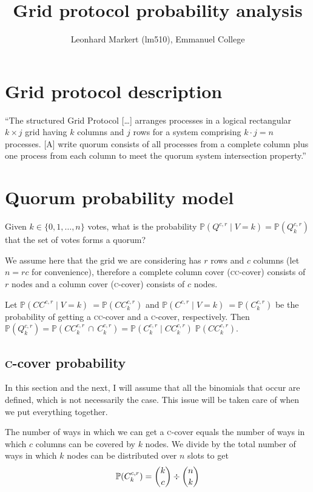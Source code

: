 \documentclass[10pt]{scrartcl}
\title{Grid protocol probability analysis}
\author{Leonhard Markert (lm510), Emmanuel College}
\begin{document}
\maketitle

\section{Grid protocol description%
  \label{grid-protocol-description}%
}

``The structured Grid Protocol [\dots] arranges processes in a logical rectangular \(k \times j\) grid having \(k\) columns and \(j\) rows for a system comprising \(k \cdot j = n\) processes. [A] write quorum consists of all processes from a complete column plus one process from each column to meet the quorum system intersection property.'' \cite{voting}

\section{Quorum probability model%
  \label{quorum-probability-model}%
}

Given \(k \in \{0, 1, \dots, n\}\) votes, what is the probability \(\mathbb{P}(Q^{c,r}\;|\;V=k) = \mathbb{P}(Q^{c,r}_k)\) that the set of votes forms a quorum?

We assume here that the grid we are considering has \(r\) rows and \(c\) columns (let \(n = r c\) for convenience), therefore a complete column cover (\textsc{cc}-cover) consists of \(r\) nodes and a column cover (\textsc{c}-cover) consists of \(c\) nodes.

Let \(\mathbb{P}(CC^{c,r}\;|\;V=k)\ = \mathbb{P}(CC^{c,r}_k)\) and \(\mathbb{P}(C^{c,r}\;|\;V=k)\ = \mathbb{P}(C^{c,r}_k)\) be the probability of getting a \textsc{cc}-cover and a \textsc{c}-cover, respectively. Then \(\mathbb{P}(Q^{c,r}_k) = \mathbb{P}(CC^{c,r}_k\,\cap\,C^{c,r}_k) = \mathbb{P}(C^{c,r}_k\;|\;CC^{c,r}_k)\;\mathbb{P}(CC^{c,r}_k)\).

\subsection{\textsc{c}-cover probability}

In this section and the next, I will assume that all the binomials that occur are defined, which is not necessarily the case. This issue will be taken care of when we put everything together.

The number of ways in which we can get a \textsc{c}-cover equals the number of ways in which \(c\) columns can be covered by \(k\) nodes. We divide by the total number of ways in which \(k\) nodes can be distributed over \(n\) slots to get \[\mathbb{P}(C^{c,r}_k) = \dbinom{k}{c} \div \dbinom{n}{k}\]
\end{document}
